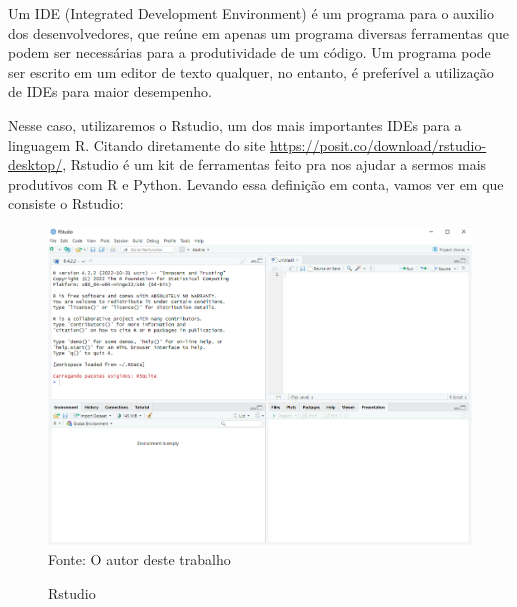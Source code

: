     Um IDE (Integrated Development Environment) é um programa para o auxilio dos desenvolvedores, que reúne em apenas um programa diversas ferramentas que podem ser necessárias para a produtividade de um código. Um programa pode ser escrito em um editor de texto qualquer, no entanto, é preferível a utilização de IDEs para maior desempenho.\par 
    Nesse caso, utilizaremos o Rstudio, um dos mais importantes IDEs para a linguagem R. Citando diretamente do site \url{https://posit.co/download/rstudio-desktop/}, Rstudio é um kit de ferramentas feito pra nos ajudar a sermos mais produtivos com R e Python. Levando essa definição em conta, vamos ver em que consiste o Rstudio: \begin{figure}[H]
    	\centering
    	\caption{Rstudio}
    	\includegraphics[width=1.0\linewidth]{Prints/screenshot028}
    	\label{fig:screenshot028}
    	{\tiny \sf Fonte: O autor deste trabalho }
    \end{figure}

